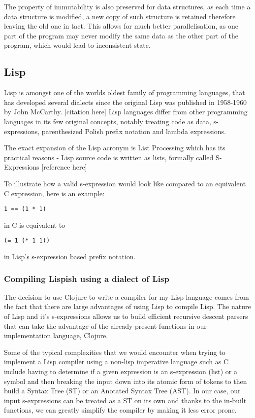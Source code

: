 The property of immutability is also preserved for data structures, as each time a data structure is modified, a new copy of such structure is retained therefore leaving the old one in tact. This allows for much better parallelisation, as one part of the program may never modify the same data as the other part of the program, which would lead to inconsistent state.

\subsection{Lisp}
Lisp is amongst one of the worlds oldest family of programming languages, that has developed several dialects since the original Lisp was published in 1958-1960 by John McCarthy. [citation here]
Lisp languages differ from other programming languages in its few original concepts, notably treating code as data, s-expressions, parenthesized Polish prefix notation and lambda expressions.

The exact expansion of the Lisp acronym is List Processing which has its practical reasons - Lisp source code is written as lists, formally called S-Expressions [reference here]

To illustrate how a valid s-expression would look like compared to an equivalent C expression, here is an example:

\begin{lstlisting}
1 == (1 * 1)
\end{lstlisting}
in C is equivalent to

\begin{lstlisting}
(= 1 (* 1 1))
\end{lstlisting}
in Lisp's s-expression based prefix notation.


\subsubsection{Compiling Lispish using a dialect of Lisp}
The decision to use Clojure to write a compiler for my Lisp language comes from the fact that there are large advantages of using Lisp to compile Lisp.
The nature of Lisp and it's s-expressions allows us to build efficient recursive descent parsers that can take the advantage of the already present functions in our implementation language, Clojure.

Some of the typical complexities that we would encounter when trying to implement a Lisp compiler using a non-lisp imperative language such as C include having to determine if a given expression is an s-expression (list) or a symbol and then breaking the input down into its atomic form of tokens to then build a Syntax Tree (ST) or an Anotated Syntax Tree (AST).
In our case, our input s-expressions can be treated as a ST on its own and thanks to the in-built functions, we can greatly simplify the compiler by making it less error prone.

